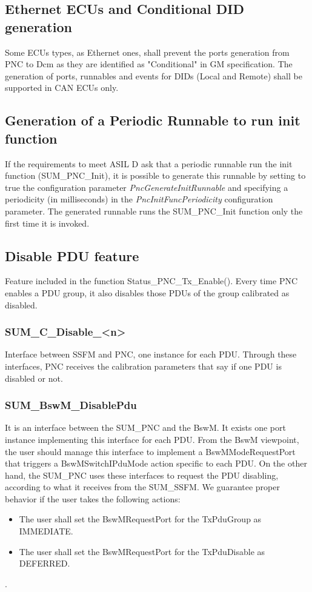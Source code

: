 \subsection{Ethernet ECUs and Conditional DID generation}
\label{subsection:EthernetECUDID}
Some ECUs types, as Ethernet ones, shall prevent the ports generation from PNC to Dcm as they are identified as "Conditional" in GM specification. The generation of ports, runnables and events for DIDs (Local and Remote) shall be supported in CAN ECUs only.

\subsection{Generation of a Periodic Runnable to run init function}
\label{subsection:generationrunnable}
If the requirements to meet ASIL D ask that a periodic runnable run the init function (SUM\_PNC\_Init), it is possible to generate this runnable by setting to true the configuration parameter \textit{PncGenerateInitRunnable} and specifying a periodicity (in milliseconds) in the \textit{PncInitFuncPeriodicity} configuration parameter. The generated runnable runs the SUM\_PNC\_Init function only the first time it is invoked.

\subsection{Disable PDU feature}
Feature included in the function Status\_PNC\_Tx\_Enable().
Every time PNC enables a PDU group, it also disables those PDUs of the group calibrated as disabled.

\subsubsection{SUM\_C\_Disable\_<n>}
Interface between SSFM and PNC, one instance for each PDU. 
Through these interfaces, PNC receives the calibration parameters that say if one PDU is disabled or not.

\subsubsection{SUM\_BswM\_DisablePdu}
It is an interface between the SUM\_PNC and the BswM. It exists one port instance implementing this interface for each PDU.\newline
From the BswM viewpoint, the user should manage this interface to implement a BswMModeRequestPort that triggers a BswMSwitchIPduMode action specific to each PDU.\newline
On the other hand, the SUM\_PNC uses these interfaces to request the PDU disabling, according to what it receives from the SUM\_SSFM.\newline
We guarantee proper behavior if the user takes the following actions:
\begin{itemize}
\item The user shall set the BswMRequestPort for the TxPduGroup as IMMEDIATE.
\item The user shall set the BswMRequestPort for the TxPduDisable as DEFERRED.
\end{itemize}.

